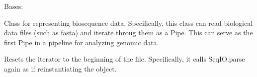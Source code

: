 \documentclass[letterpaper,10pt,english]{sphinxmanual}
\begin{document}
\begin{fulllineitems}
\label{\detokenize{Fireworks:Fireworks.toolbox.pipes.BioSeqPipe}}
Bases: {\hyperref[\detokenize{Fireworks:Fireworks.core.pipe.Pipe}]{}}

Class for representing biosequence data.
Specifically, this class can read biological data files (such as fasta) and iterate throug them as a Pipe.
This can serve as the first Pipe in a pipeline for analyzing genomic data.

\begin{fulllineitems}
\label{\detokenize{Fireworks:Fireworks.toolbox.pipes.BioSeqPipe.name}}
\end{fulllineitems}


\begin{fulllineitems}
\label{\detokenize{Fireworks:Fireworks.toolbox.pipes.BioSeqPipe.reset}}
Resets the iterator to the beginning of the file. Specifically, it calls SeqIO.parse again as if reinstantiating the object.

\end{fulllineitems}


\end{fulllineitems}

\end{document}
